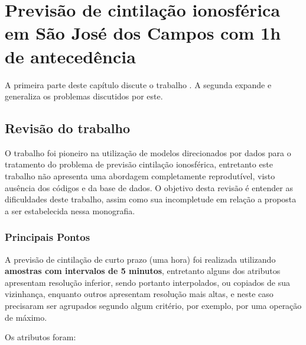 \chapter{Previsão de cintilação ionosférica em São José dos Campos com 1h de antecedência}\label{ch:revisonrezende}

A primeira parte deste capítulo discute o trabalho \cite{REZENDE:2009}. A segunda expande e generaliza os problemas discutidos por este.

\section{Revisão do trabalho \cite{REZENDE:2009}}

O trabalho \cite{REZENDE:2009} foi pioneiro na utilização de modelos direcionados por dados para o tratamento do problema de previsão cintilação ionosférica, entretanto este trabalho não apresenta uma abordagem completamente reprodutível, visto ausência dos códigos e da base de dados. O objetivo desta revisão é entender as dificuldades deste trabalho, assim como sua incompletude em relação a proposta a ser estabelecida nessa monografia.

\subsection{Principais Pontos}

A previsão de cintilação de curto prazo (uma hora) foi realizada utilizando {\bf amostras com intervalos de 5 minutos}, entretanto alguns dos atributos apresentam resolução inferior, sendo portanto interpolados, ou copiados de sua vizinhança, enquanto outros apresentam resolução mais altas, e neste caso precisaram ser agrupados segundo algum critério, por exemplo, por uma operação de máximo.

Os atributos foram:

